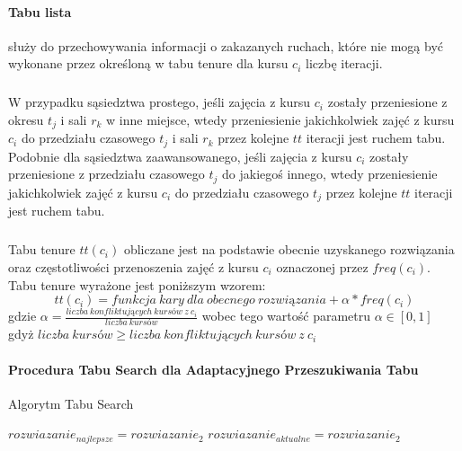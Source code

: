 \paragraph{Tabu lista}
służy do przechowywania informacji o zakazanych ruchach, które nie mogą być wykonane przez określoną w tabu tenure dla kursu $c_{i}$ liczbę iteracji.
\subparagraph{}W przypadku sąsiedztwa prostego, jeśli zajęcia z kursu $c_i$ zostały przeniesione z okresu $t_j$ i sali $r_k$ w inne miejsce, wtedy przeniesienie jakichkolwiek zajęć z kursu $c_i$ do przedziału czasowego $t_j$ i sali $r_k$ przez kolejne $tt$ iteracji jest ruchem tabu. Podobnie dla sąsiedztwa zaawansowanego, jeśli zajęcia z kursu $c_i$ zostały przeniesione z przedziału czasowego $t_j$ do jakiegoś innego, wtedy przeniesienie jakichkolwiek zajęć z kursu $c_i$ do przedziału czasowego $t_j$ przez kolejne $tt$ iteracji jest ruchem tabu.
\subparagraph{}
Tabu tenure $tt(c_{i})$ obliczane jest na podstawie obecnie uzyskanego rozwiązania oraz częstotliwości przenoszenia zajęć z kursu $c_{i}$ oznaczonej przez $freq(c_{i})$. \\
Tabu tenure wyrażone jest poniższym wzorem: 
 \[tt(c_{i}) = funkcja\ kary\ dla\ obecnego\ rozwiązania + \alpha * freq(c_{i}) \] 
gdzie ${\alpha = \frac{liczba\ konfliktujących\ kursów\ z\ c_{i}}{liczba\ kursów}}$ wobec tego wartość parametru ${\alpha \in [0, 1]}$ \\
gdyż ${liczba\ kursów \geq liczba\ konfliktujących\ kursów\ z\ c_{i}} $

\paragraph{Procedura Tabu Search dla Adaptacyjnego Przeszukiwania Tabu}
\hfill
\begin{algorithm}[H]
    \caption{Algorytm Tabu Search}
    \begin{algorithmic}
    \STATE $rozwiazanie_{najlepsze} = rozwiazanie_2$
    \STATE $rozwiazanie_{aktualne} = rozwiazanie_2$
    \ENDIF

    \ENDWHILE
    \end{algorithmic}
    \end{algorithm}

